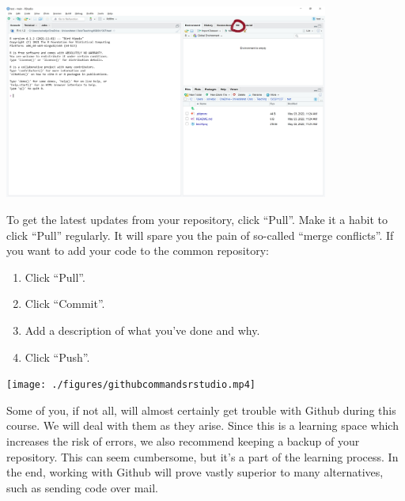 \documentclass[
]{article}
\providecommand{\tightlist}{%
  \setlength{\itemsep}{0pt}\setlength{\parskip}{0pt}}
\begin{document}
\includegraphics[width=0.8\textwidth,height=\textheight]{./figures/project6.png}

To get the latest updates from your repository, click ``Pull''. Make it
a habit to click ``Pull'' regularly. It will spare you the pain of
so-called ``merge conflicts''. If you want to add your code to the
common repository:

\begin{enumerate}
\def\labelenumi{\arabic{enumi}.}
\tightlist
\item
  Click ``Pull''.
\item
  Click ``Commit''.
\item
  Add a description of what you've done and why.
\item
  Click ``Push''.
\end{enumerate}

\texttt{[image: ./figures/githubcommandsrstudio.mp4]}

Some of you, if not all, will almost certainly get trouble with Github
during this course. We will deal with them as they arise. Since this is
a learning space which increases the risk of errors, we also recommend
keeping a backup of your repository. This can seem cumbersome, but it's
a part of the learning process. In the end, working with Github will
prove vastly superior to many alternatives, such as sending code over
mail.
\end{document}
